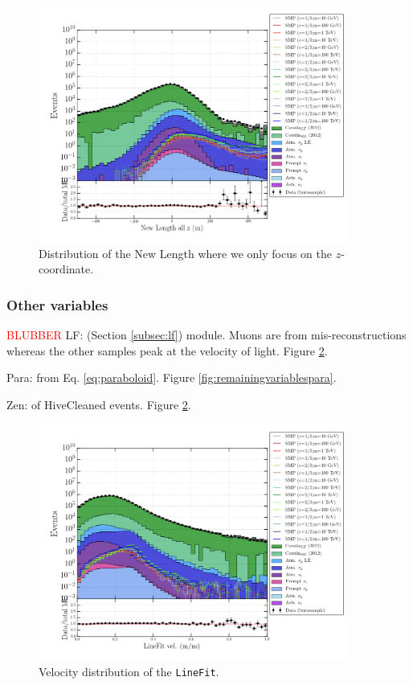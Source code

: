 \begin{figure}
\centering
\includegraphics[width=0.9\textwidth]{chapter8/img/1D_stack_newlength_all_z.png}
\caption{Distribution of the New Length where we only focus on the $z$-coordinate.}
\label{fig:newvariablesnewlengthallz}
\end{figure}


\subsubsection{Other variables}
\label{subsub:other}
\textcolor{red}{BLUBBER}
LF: (Section \ref{subsec:lf}) module. Muons are from mis-reconstructions whereas the other samples peak at the velocity of light. Figure \ref{fig:remainingvariableslf}.

Para:  from Eq. \ref{eq:paraboloid}. Figure \ref{fig:remainingvariablespara}.

Zen: of HiveCleaned events. Figure \ref{fig:remainingvariableslf}.

\begin{figure}
\centering
\includegraphics[width=0.9\textwidth]{chapter8/img/1D_stack_linefitvelocity}
\caption{Velocity distribution of the \texttt{LineFit}.}
\label{fig:remainingvariableslf}
\end{figure}


